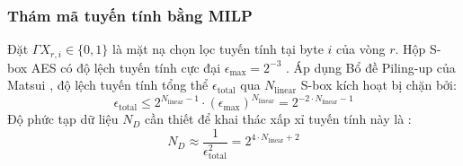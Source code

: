 \documentclass[10pt,twocolumn]{article}
\begin{document}
\subsubsection{Thám mã tuyến tính bằng MILP}
Đặt $\Gamma X_{r, i} \in \{0, 1\}$ là mặt nạ chọn lọc tuyến tính tại byte $i$ của vòng $r$. Hộp S-box AES có độ lệch tuyến tính cực đại $\epsilon_{\max} = 2^{-3}$ \cite{daemen2002design}. Áp dụng Bổ đề Piling-up của Matsui \cite{matsui1993linear}, độ lệch tuyến tính tổng thể $\epsilon_{\text{total}}$ qua $N_{\text{linear}}$ S-box kích hoạt bị chặn bởi:
\begin{equation}
    \epsilon_{\text{total}} \le 2^{N_{\text{linear}} - 1} \cdot (\epsilon_{\max})^{N_{\text{linear}}} = 2^{-2 \cdot N_{\text{linear}} - 1}
\end{equation}
Độ phức tạp dữ liệu $N_D$ cần thiết để khai thác xấp xỉ tuyến tính này là \cite{matsui1993linear}:
\begin{equation}
    N_D \approx \frac{1}{\epsilon_{\text{total}}^2} = 2^{4 \cdot N_{\text{linear}} + 2}
\end{equation}

\begin{table}[htbp]
\caption{Quét cận dưới S-box kích hoạt (thám mã tuyến tính).}
\label{tab:linear_results_vi}
\centering
\small
{}
\end{table}
\end{document}
